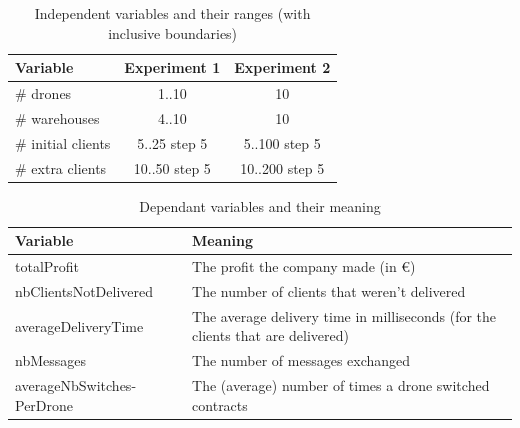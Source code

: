 \documentclass[10pt,a4paper,twocolumn]{article}
\begin{document}
\begin{table}[hp]
	\begin{center}
		\begin{tabular}{ lcc }
			\hline
			Variable & Experiment 1 & Experiment 2 \\ \hline
			\# drones & 1..10 & 10 \\
			\# warehouses & 4..10 & 10 \\
			\# initial clients & 5..25 step 5 & 5..100 step 5 \\
			\# extra clients & 10..50 step 5 & 10..200 step 5 \\
			\hline
		\end{tabular}
	\end{center}
	\caption{Independent variables and their ranges (with inclusive boundaries)}
	\label{tbl:independent}
\end{table}
\begin{table}[htp]
	\begin{center}
		\begin{tabular}{ p{}p{} }
			\hline
			Variable & Meaning \\ \hline
			totalProfit & The profit the company made (in \euro{}) \\
			nbClientsNotDelivered & The number of clients that weren't delivered \\
			averageDeliveryTime & The average delivery time in milliseconds (for the clients that are delivered) \\
			nbMessages & The number of messages exchanged \\
			averageNbSwitches-PerDrone & The (average) number of times a drone switched contracts \\
			\hline
		\end{tabular}
	\end{center}
	\caption{Dependant variables and their meaning}
	\label{tbl:dependent}
\end{table}
\end{document}
